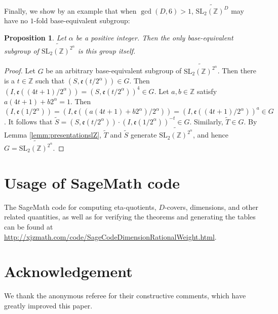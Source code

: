 \documentclass[12pt]{amsart}
\numberwithin{equation}{section}
\theoremstyle{plain}
\newtheorem{prop}[thm]{Proposition}
\theoremstyle{definition}
\theoremstyle{remark}
\newcommand\etp[1]{\mathfrak{e}\left(#1\right)}
\newcommand\numZ{\mathbb{Z}}
\newcommand\slZ{\mathrm{SL}_2(\mathbb{Z})}
\newcommand\Dcover[2]{\widetilde{#1^{#2}}}
\begin{document}
\begin{appendix}
Finally, we show by an example that when $\gcd(D,6)>1$, $\Dcover{\slZ}{D}$ may have no $1$-fold base-equivalent subgroup:
\begin{prop}
Let $\alpha$ be a positive integer. Then the only base-equivalent subgroup of $\Dcover{\slZ}{2^\alpha}$ is this group itself.
\end{prop}
\begin{proof}
Let $G$ be an arbitrary base-equivalent subgroup of $\Dcover{\slZ}{2^\alpha}$. Then there is a $t\in\numZ$ such that $(S,\etp{t/2^\alpha})\in G$. Then $(I,\etp{(4t+1)/2^\alpha})=(S,\etp{t/2^\alpha})^4\in G$. Let $a,b\in\numZ$ satisfy $a(4t+1)+b2^\alpha=1$. Then $(I,\etp{1/2^\alpha})=(I,\etp{(a(4t+1)+b2^\alpha)/2^\alpha})=(I,\etp{(4t+1)/2^\alpha})^a\in G$. It follows that $\widetilde{S}=(S,\etp{t/2^\alpha})\cdot (I,\etp{1/2^\alpha})^{-t}\in G$. Similarly, $\widetilde{T}\in G$. By Lemma \ref{lemm:presentationslZ}, $\widetilde{T}$ and $\widetilde{S}$ generate $\Dcover{\slZ}{2^\alpha}$, and hence $G=\Dcover{\slZ}{2^\alpha}$.
\end{proof}

\section{Usage of SageMath code}
\label{apx:Usage of SageMath code}
The SageMath code for computing eta-quotients, $D$-covers, dimensions, and other related quantities, as well as for verifying the theorems and generating the tables can be found at \url{http://xjzmath.com/code/SageCodeDimensionRationalWeight.html}.
\end{appendix}


\section*{Acknowledgement}
We thank the anonymous referee for their constructive comments, which have greatly improved this paper.




\end{document}
